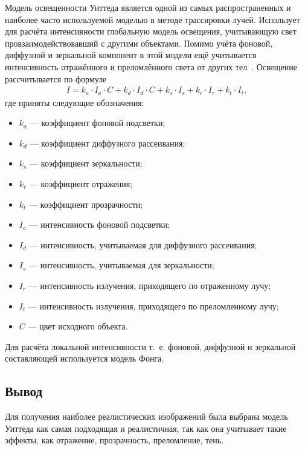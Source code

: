 Модель освещенности Уиттеда является одной из самых распространенных и наиболее часто используемой моделью в методе трассировки лучей. Использует для расчёта интенсивности глобальную модель освещения, учитывающую свет провзаимодействовавший с другими объектами. Помимо учёта фоновой, диффузной и зеркальной компонент в этой модели ещё учитывается интенсивность отражённого и преломлённого света от других тел~\cite{porev}. Освещение рассчитывается по формуле
\begin{equation} \label{eq:whitted}
	\begin{aligned}
		I = k_{a} \cdot I_{a} \cdot C + k_{d} \cdot I_{d} \cdot C + k_{s} \cdot I_{s} + k_{r} \cdot I_{r} + k_{t} \cdot I_{t},
	\end{aligned}
\end{equation}
где приняты следующие обозначения:
\begin{itemize}[label = ---]
	\item $k_{a}$ --- коэффициент  фоновой подсветки;
	\item $k_{d}$ --- коэффициент диффузного рассеивания;
	\item $k_{s}$ --- коэффициент зеркальности;
	\item $k_{r}$ --- коэффициент отражения;
	\item $k_{t}$ --- коэффициент прозрачности;
	\item $I_{a}$ --- интенсивность фоновой подсветки;
	\item $I_{d}$ --- интенсивность, учитываемая для диффузного рассеивания;
	\item $I_{s}$ --- интенсивность, учитываемая для зеркальности;
	\item $I_{r}$ --- интенсивность излучения, приходящего по отраженному лучу;
	\item $I_{t}$ --- интенсивность излучения, приходящего по преломленному лучу;
	\item $C$ --- цвет исходного объекта.
\end{itemize}

Для расчёта локальной интенсивности т.~е. фоновой, диффузной и зеркальной составляющей используется модель Фонга. 

\subsection*{Вывод}

Для получения наиболее реалистических изображений была выбрана модель Уиттеда как самая подходящая и реалистичная, так как она учитывает такие эффекты, как отражение, прозрачность, преломление, тень.